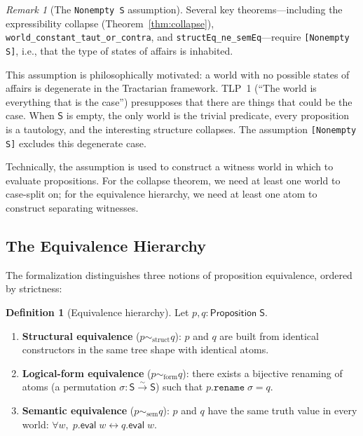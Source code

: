 \documentclass[10pt, letterpaper]{article}
\theoremstyle{definition}
\newtheorem{definition}[theorem]{Definition}
\theoremstyle{remark}
\newtheorem{remark}[theorem]{Remark}
\newcommand{\Sach}{\mathsf{S}}
\newcommand{\eval}{\mathsf{eval}}
\newcommand{\structEq}{\sim_{\mathrm{struct}}}
\newcommand{\formEq}{\sim_{\mathrm{form}}}
\newcommand{\semEq}{\sim_{\mathrm{sem}}}
\begin{document}
\begin{remark}[The \texttt{Nonempty S} assumption]
\label{rem:nonempty}
Several key theorems---including the expressibility collapse
(Theorem~\ref{thm:collapse}), \texttt{world\_constant\_taut\_or\_contra},
and \texttt{structEq\_ne\_semEq}---require \texttt{[Nonempty S]},
i.e., that the type of states of affairs is inhabited.

This assumption is philosophically motivated: a world with no
possible states of affairs is degenerate in the Tractarian
framework.  TLP~1 (``The world is everything that is the case'')
presupposes that there are things that could be the case.
When $\Sach$ is empty, the only world is the trivial
predicate, every proposition is a tautology, and the
interesting structure collapses.  The assumption
\texttt{[Nonempty S]} excludes this degenerate case.

Technically, the assumption is used to construct a witness
world in which to evaluate propositions.  For the collapse
theorem, we need at least one world to case-split on; for the
equivalence hierarchy, we need at least one atom to
construct separating witnesses.
\end{remark}

\subsection{The Equivalence Hierarchy}
\label{sec:hierarchy}

The formalization distinguishes three notions of proposition
equivalence, ordered by strictness:

\begin{definition}[Equivalence hierarchy]
\label{def:hierarchy}
Let $p, q : \mathsf{Proposition}\;\Sach$.
\begin{enumerate}[nosep]
  \item \textbf{Structural equivalence} ($p \structEq q$):
    $p$ and $q$ are built from identical constructors in the
    same tree shape with identical atoms.
  \item \textbf{Logical-form equivalence} ($p \formEq q$):
    there exists a bijective renaming of atoms (a permutation
    $\sigma : \Sach \xrightarrow{\sim} \Sach$) such that
    $p.\mathtt{rename}\;\sigma = q$.
  \item \textbf{Semantic equivalence} ($p \semEq q$):
    $p$ and $q$ have the same truth value in every world:
    $\forall w,\; p.\eval\;w \leftrightarrow q.\eval\;w$.
\end{enumerate}
\end{definition}
\end{document}
